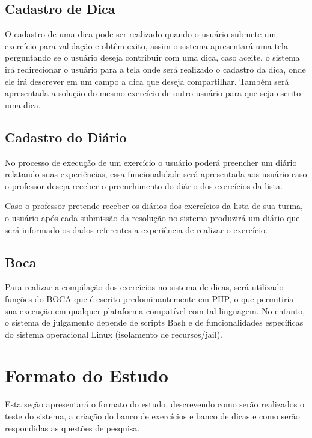 \subsection{Cadastro de Dica}

O cadastro de uma dica pode ser realizado quando o usuário submete um exercício para validação e obtêm exito, assim o sistema apresentará uma tela perguntando se o usuário deseja contribuir com uma dica, caso aceite, o sistema irá redirecionar o usuário para a tela onde será realizado o cadastro da dica, onde ele irá descrever em um campo a dica que deseja compartilhar. Também será apresentada a solução do mesmo exercício de outro usuário para que seja escrito uma dica. 

\subsection{Cadastro do Diário}

No processo de execução de um exercício o usuário poderá preencher um diário relatando suas experiências, essa funcionalidade será apresentada aos usuário caso o professor deseja receber o preenchimento do diário dos exercícios da lista. 

Caso o professor pretende receber os diários dos exercícios da lista de sua turma, o usuário após cada submissão da resolução no sistema produzirá um diário que será informado os dados referentes a experiência de realizar o exercício. 

\subsection{Boca}

Para realizar a compilação dos exercícios no sistema de dicas, será utilizado funções do  BOCA que é escrito predominantemente em PHP, o que permitiria sua execução em qualquer plataforma compatível com tal linguagem. No entanto, o sistema de julgamento depende de scripts Bash e de funcionalidades específicas do sistema operacional Linux (isolamento de recursos/jail). 

\section{Formato do Estudo}

Esta seção apresentará o formato do estudo, descrevendo como serão realizados o teste do sistema, a criação do banco de exercícios e banco de dicas e como serão respondidas as questões de pesquisa.


